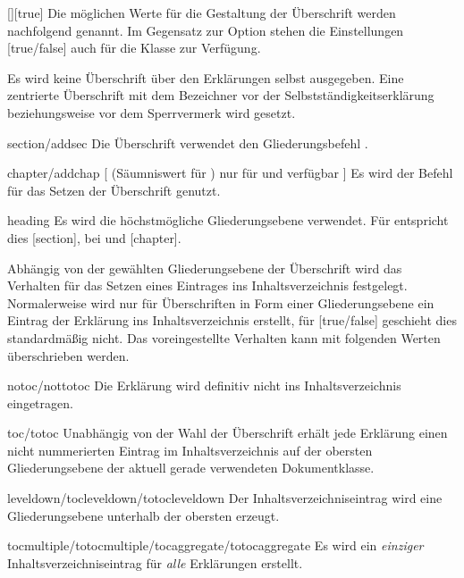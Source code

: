 \begin{Declaration*}{}
\begin{Declaration*}{}
\begin{Declaration*}{}
\begin{Declaration}{[\PSet]}[true]
Die möglichen Werte für die Gestaltung der Überschrift werden nachfolgend 
genannt. Im Gegensatz zur Option  stehen die Einstellungen 
[true/false] auch für die Klasse  zur 
Verfügung.
%
\begin{values}
\itemfalse
  Es wird keine Überschrift über den Erklärungen selbst ausgegeben.
\itemtrue*
  Eine zentrierte Überschrift mit dem Bezeichner  vor 
  der Selbstständigkeitserklärung beziehungsweise  vor dem 
  Sperrvermerk wird gesetzt. 
\item[section/addsec]
  Die Überschrift verwendet den Gliederungsbefehl .
\item[chapter/addchap][%
    (Säumniswert für \Class{tudscrbook})
    nur für \Class{tudscrreprt} und \Class{tudscrbook} verfügbar%
  ]
  Es wird der Befehl  für das Setzen der Überschrift genutzt. 
\item[heading]
  Es wird die höchstmögliche Gliederungsebene verwendet. Für 
   entspricht dies [section], bei 
   und  [chapter].
\end{values}
%
Abhängig von der gewählten Gliederungsebene der Überschrift wird das Verhalten 
für das Setzen eines Eintrages ins Inhaltsverzeichnis festgelegt. Normalerweise 
wird nur für Überschriften in Form einer Gliederungsebene ein Eintrag der 
Erklärung ins Inhaltsverzeichnis erstellt, für [true/false] 
geschieht dies standardmäßig nicht. Das voreingestellte Verhalten kann mit 
folgenden Werten überschrieben werden.
%
\begin{values}
\item[notoc/nottotoc]
  Die Erklärung wird definitiv nicht ins Inhaltsverzeichnis eingetragen.
\item[toc/totoc]
  Unabhängig von der Wahl der Überschrift erhält jede Erklärung einen nicht
  nummerierten Eintrag im Inhaltsverzeichnis auf der obersten Gliederungsebene  
  der aktuell gerade verwendeten Dokumentklasse. 
\item[leveldown/tocleveldown/totocleveldown]
  Der Inhaltsverzeichniseintrag wird eine Gliederungsebene unterhalb der 
  obersten erzeugt.
\item[tocmultiple/totocmultiple/tocaggregate/totocaggregate]
  Es wird ein \emph{einziger} Inhaltsverzeichniseintrag für \emph{alle} 
  Erklärungen erstellt.
\end{values}

\end{Declaration}
\end{Declaration*}
\end{Declaration*}
\end{Declaration*}
